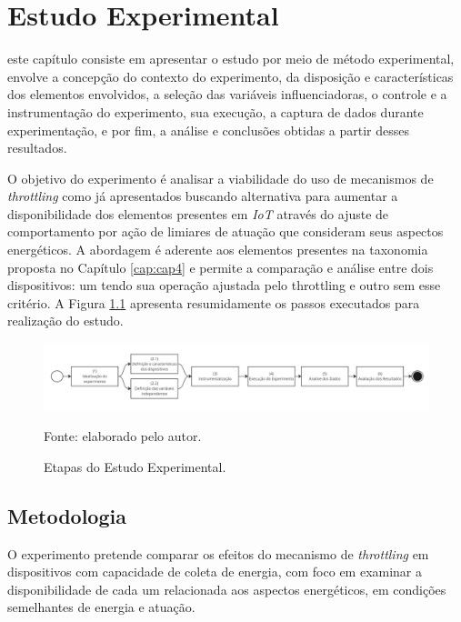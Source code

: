 \chapter{Estudo Experimental}
\label{cap:cap6}

este capítulo consiste em apresentar o estudo por meio de método experimental, envolve a concepção do contexto do experimento, da disposição e características dos elementos envolvidos, a seleção das variáveis influenciadoras, o controle e a instrumentação do experimento, sua execução, a captura de dados durante experimentação, e por fim, a análise e conclusões obtidas a partir desses resultados. 

O objetivo do experimento é analisar a viabilidade do uso de mecanismos de \textit{throttling} como já apresentados buscando alternativa para aumentar a disponibilidade dos elementos presentes em \textit{IoT} através do ajuste de comportamento por ação de limiares de atuação que consideram seus aspectos energéticos. A abordagem é aderente aos elementos presentes na taxonomia proposta no Capítulo \ref{cap:cap4} e permite a comparação e análise entre dois dispositivos: um tendo sua operação ajustada pelo throttling e outro sem esse critério. A Figura \ref{fig:cap6metodologia} apresenta resumidamente os passos executados para realização do estudo.



\begin{figure}[H]
	\centering
	\caption{Etapas do Estudo Experimental.}
	\label{fig:cap6metodologia}
	\includegraphics[width=1\linewidth]{Imagens/cap6/cap6metodologia.jpg}
	
	Fonte: elaborado pelo autor.
\end{figure} 


\section{Metodologia}

O experimento pretende comparar os efeitos do mecanismo de \textit{throttling} em dispositivos com capacidade de coleta de energia, com foco em examinar a disponibilidade de cada um relacionada aos  aspectos energéticos, em condições semelhantes de energia e atuação.

